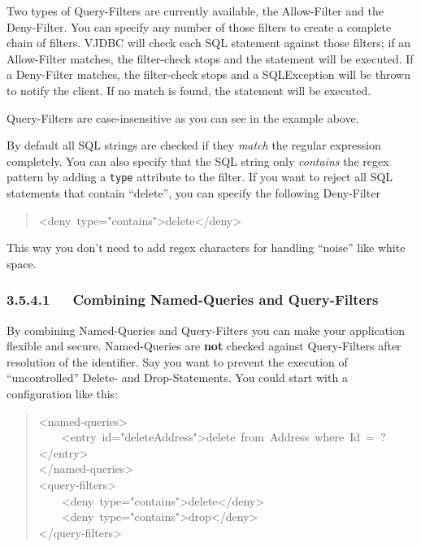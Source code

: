 \documentclass[10pt,a4paper,english]{article}
\begin{document}
Two types of Query-Filters are currently available, the Allow-Filter and the Deny-Filter. You can specify any number of those filters to create a complete chain of filters. VJDBC will check each SQL statement against those filters; if an Allow-Filter matches, the filter-check stops and the statement will be executed. If a Deny-Filter matches, the filter-check stops and a SQLException will be thrown to notify the client. If no match is found, the statement will be executed.

Query-Filters are case-insensitive as you can see in the example above.

By default all SQL strings are checked if they \emph{match} the regular expression completely. You can also specify that the SQL string only \emph{contains} the regex pattern by adding a \texttt{type} attribute to the filter. If you want to reject all SQL statements that contain ``delete'', you can specify the following Deny-Filter
\begin{quote}{\ttfamily \raggedright \noindent
<deny~type="contains">delete</deny>
}\end{quote}

This way you don't need to add regex characters for handling ``noise'' like white space.



\hypertarget{combining-named-queries-and-query-filters}{}
\subsubsection*{3.5.4.1~~~Combining Named-Queries and Query-Filters}

By combining Named-Queries and Query-Filters you can make your application flexible and secure. Named-Queries are \textbf{not} checked against Query-Filters after resolution of the identifier. Say you want to prevent the execution of ``uncontrolled'' Delete- and Drop-Statements. You could start with a configuration like this:
\begin{quote}{\ttfamily \raggedright \noindent
<named-queries>~\\
~~~~<entry~id="deleteAddress">delete~from~Address~where~Id~=~?</entry>~\\
</named-queries>~\\
<query-filters>~\\
~~~~<deny~type="contains">delete</deny>~\\
~~~~<deny~type="contains">drop</deny>~\\
</query-filters>
}\end{quote}
\end{document}
